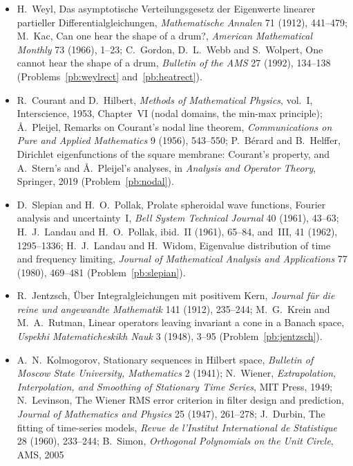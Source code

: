 \begin{itemize}
\emph{Philosophical Magazine} 6 (1961), 1061--1063; R.~Burton and R.~Pemantle, Local characteristics, entropy and limit theorems for spanning trees and domino tilings via transfer-impedances,
\emph{Annals of Probability} 21 (1993), 1329--1371 (Problem~\ref{pb:gridtrees}).
\item H.~Weyl, Das asymptotische Verteilungsgesetz der Eigenwerte linearer partieller Differentialgleichungen, \emph{Mathematische Annalen} 71 (1912), 441--479; M.~Kac, Can one hear the shape of a
drum?, \emph{American Mathematical Monthly} 73 (1966), 1--23; C.~Gordon, D.~L.~Webb and S.~Wolpert, One cannot hear the shape of a drum, \emph{Bulletin of the AMS} 27 (1992), 134--138
(Problems~\ref{pb:weylrect} and~\ref{pb:heatrect}).
\item R.~Courant and D.~Hilbert, \emph{Methods of Mathematical Physics}, vol.~I, Interscience, 1953, Chapter~VI (nodal domains, the min-max principle); Å.~Pleijel, Remarks on Courant's nodal line
theorem, \emph{Communications on Pure and Applied Mathematics} 9 (1956), 543--550; P.~Bérard and B.~Helffer, Dirichlet eigenfunctions of the square membrane: Courant's property, and A.~Stern's
and Å.~Pleijel's analyses, in \emph{Analysis and Operator Theory}, Springer, 2019 (Problem~\ref{pb:nodal}).
\item D.~Slepian and H.~O.~Pollak, Prolate spheroidal wave functions, Fourier analysis and uncertainty~I, \emph{Bell System Technical Journal} 40 (1961), 43--63; H.~J.~Landau and H.~O.~Pollak, ibid.~II
(1961), 65--84, and~III, 41 (1962), 1295--1336; H.~J.~Landau and H.~Widom, Eigenvalue distribution of time and frequency limiting, \emph{Journal of Mathematical Analysis and Applications} 77 (1980),
469--481 (Problem~\ref{pb:slepian}).
\item R.~Jentzsch, Über Integralgleichungen mit positivem Kern, \emph{Journal für die reine und angewandte Mathematik} 141 (1912), 235--244; M.~G.~Krein and M.~A.~Rutman, Linear operators leaving
invariant a cone in a Banach space, \emph{Uspekhi Matematicheskikh Nauk} 3 (1948), 3--95 (Problem~\ref{pb:jentzsch}).
\item A.~N.~Kolmogorov, Stationary sequences in Hilbert space, \emph{Bulletin of Moscow State University, Mathematics} 2 (1941); N.~Wiener, \emph{Extrapolation, Interpolation, and Smoothing of
Stationary Time Series}, MIT Press, 1949; N.~Levinson, The Wiener RMS error criterion in filter design and prediction, \emph{Journal of Mathematics and Physics} 25 (1947), 261--278; J.~Durbin, The
fitting of time-series models, \emph{Revue de l'Institut International de Statistique} 28 (1960), 233--244; B.~Simon, \emph{Orthogonal Polynomials on the Unit Circle}, AMS, 2005

\end{itemize}
